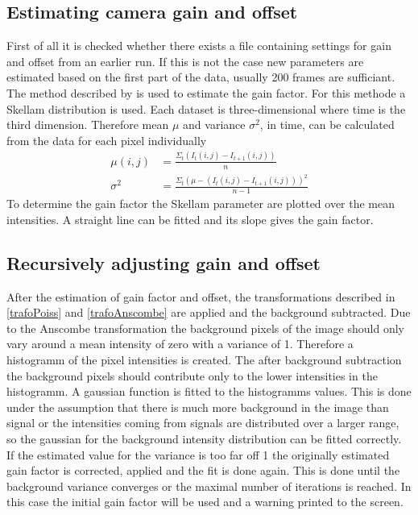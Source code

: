 \subsection{Estimating camera gain and offset}
First of all it is checked whether there exists a file containing settings for gain and offset from an earlier run. If this is not the case new parameters are estimated based on the first part of the data, usually 200 frames are sufficiant.\newline
The method described by \cite{skellam} is used to estimate the
gain factor. For this methode a Skellam distribution is used. 
Each dataset is three-dimensional where time is the third
dimension. Therefore mean $\mu$ and variance $\sigma^2$, in time, can be calculated from
the data for each pixel individually
\begin{align}
	\mu(i,j) & = \frac{\Sigma_t(I_t(i,j)-I_{t+1}(i,j))}{n}\\
	\sigma^2 & = \frac{\Sigma_t(\mu-(I_t(i,j)-I_{t+1}(i,j)))^2}{n-1}
\end{align} 
To determine the gain factor the Skellam parameter are plotted over the mean
intensities. A straight line can be fitted and its slope gives the gain
factor.
\subsection{Recursively adjusting gain and offset}
After the estimation of gain factor and offset, the transformations described in \ref{trafoPoiss} and \ref{trafoAnscombe} are applied and the background subtracted.\newline
Due to the Anscombe transformation the background pixels of the image should only vary around a mean intensity of zero with a variance of 1. Therefore a histogramm of the pixel intensities is created. The after background subtraction the background pixels should contribute only to the lower intensities in the histogramm. A gaussian function is fitted to the histogramms values. This is done under the assumption that there is much more background in the image than signal or the intensities coming from signals are distributed over a larger range, so the gaussian for the background intensity distribution can be fitted correctly.\newline
If the estimated value for the variance is too far off 1 the originally estimated gain factor is corrected, applied and the fit is done again. This is done until the background variance converges or the maximal number of iterations is reached. In this case the initial gain factor will be used and a warning printed to the screen.
